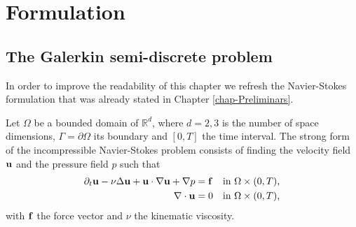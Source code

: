 

\section{Formulation}
\label{sec-C4_formulation}
\subsection{The Galerkin semi-discrete problem}
\label{subsec-C4_NS_formulation}
In order to improve the readability of this chapter we refresh the Navier-Stokes formulation that was already stated in Chapter \ref{chap-Preliminars}. 

Let $\Omega$ be a bounded domain of $\mathbb{R}^d$, where $d=2,3$ is the number of space dimensions, $\Gamma=\partial\Omega$ its boundary and $[0,T]$ the time interval. The strong form of the incompressible Navier-Stokes problem consists of finding the velocity field ${\bf u}$ and the pressure field $p$ such that 
\begin{align}
\label{eq-C4_NS_strong_mome}
\partial_t{\bf u}-\nu\Delta{\bf u}+{\bf u}\cdot\nabla{\bf u}+\nabla p&={\bf f}&\mbox{in $\Omega\times(0,T)$,}\\
\label{eq-C4_NS_strong_inc}
\nabla\cdot{\bf u}&=0&\mbox{in $\Omega\times(0,T)$,}
\end{align}
with ${\bf f}$ the force vector and $\nu$ the kinematic viscosity. 

